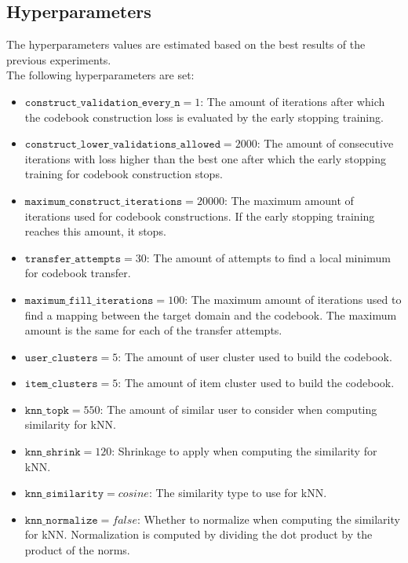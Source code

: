 \subsection{Hyperparameters}

The hyperparameters values are estimated based on the best results of the previous experiments.\\
The following hyperparameters are set:
\begin{itemize}
\item $\texttt{construct\_validation\_every\_n} = 1$: The amount of iterations after which the codebook construction loss is evaluated by the early stopping training.
\item $\texttt{construct\_lower\_validations\_allowed} = 2000$: The amount of consecutive iterations with loss higher than the best one after which the early stopping training for codebook construction stops.
\item $\texttt{maximum\_construct\_iterations} = 20000$: The maximum amount of iterations used for codebook constructions. If the early stopping training reaches this amount, it stops.
\item $\texttt{transfer\_attempts} = 30$: The amount of attempts to find a local minimum for codebook transfer.
\item $\texttt{maximum\_fill\_iterations} = 100$: The maximum amount of iterations used to find a mapping between the target domain and the codebook. The maximum amount is the same for each of the transfer attempts.
\item $\texttt{user\_clusters} = 5$: The amount of user cluster used to build the codebook.
\item $\texttt{item\_clusters} = 5$: The amount of item cluster used to build the codebook.
\item $\texttt{knn\_topk} = 550$: The amount of similar user to consider when computing similarity for kNN.
\item $\texttt{knn\_shrink} = 120$: Shrinkage to apply when computing the similarity for kNN.
\item $\texttt{knn\_similarity} = cosine$: The similarity type to use for kNN.
\item $\texttt{knn\_normalize} = false$: Whether to normalize when computing the similarity for kNN. Normalization is computed by dividing the dot product by the product of the norms.
\end{itemize}


